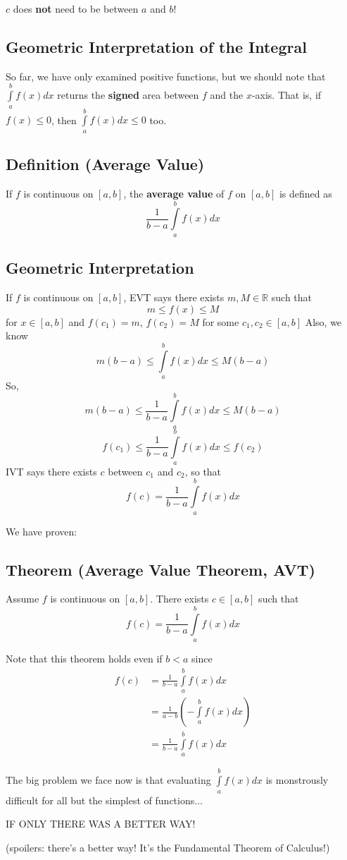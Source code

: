 \begin{remark}
    $ c $ does \textbf{not} need to be between $ a $ and $ b $!
\end{remark}

\subsection{Geometric Interpretation of the Integral}
So far, we have only examined positive functions, but we should note that $ \int\limits_{a}^{b} f(x)dx $
returns the \textbf{signed} area between $ f $ and the $ x $-axis. That is, if $ f(x)\le 0 $, then
$ \int\limits_{a}^{b} f(x)dx\le 0 $ too.

\subsection{Definition (Average Value)}
If $ f $ is continuous on $ [a,b] $, the \textbf{average value} of $ f $ on $ [a,b] $ is defined as
\[ \frac{1}{b-a} \int\limits_{a}^{b} f(x)dx \]

\subsection{Geometric Interpretation}
If $ f $ is continuous on $ [a,b] $, EVT says there exists $ m,M\in\mathbb{R} $ such that
\[m\le f(x) \le M\]
for $ x\in[a,b] $ and $ f(c_1)=m $, $ f(c_2)=M $ for some $ c_1,c_2\in[a,b] $
Also, we know \[ m(b-a)\le \int\limits_{a}^{b} f(x) d{x} \le M(b-a) \]
So,
\[ m(b-a)\le \frac{1}{b-a} \int\limits_{a}^{b} f(x) d{x} \le M(b-a) \]
\[ f(c_1)\le \frac{1}{b-a} \int\limits_{a}^{b} f(x) d{x} \le f(c_2) \]
IVT says there exists $ c $ between $ c_1 $ and $ c_2 $, so that
\[ f(c)=\frac{1}{b-a} \int\limits_{a}^{b} f(x) d{x} \]

We have proven:
\subsection{Theorem (Average Value Theorem, AVT)}
Assume $ f $ is continuous on $ [a,b] $. There exists $ c\in[a,b] $ such that
\[ f(c)=\frac{1}{b-a} \int\limits_{a}^{b} f(x) d{x} \]

\begin{remark}
    Note that this theorem holds even if $ b<a $ since
    \begin{align*}
        f(c) & =\frac{1}{b-a} \int\limits_{a}^{b} f(x) d{x}              \\
             & =\frac{1}{a-b}\left(-\int\limits_{a}^{b} f(x) d{x}\right) \\
             & =\frac{1}{b-a} \int\limits_{a}^{b} f(x) d{x}
    \end{align*}
\end{remark}

The big problem we face now is that evaluating $ \int\limits_{a}^{b} f(x) d{x} $ is
monstrously difficult for all but the simplest of functions...

IF ONLY THERE WAS A BETTER WAY!

(spoilers: there's a better way! It's the Fundamental Theorem of Calculus!)

